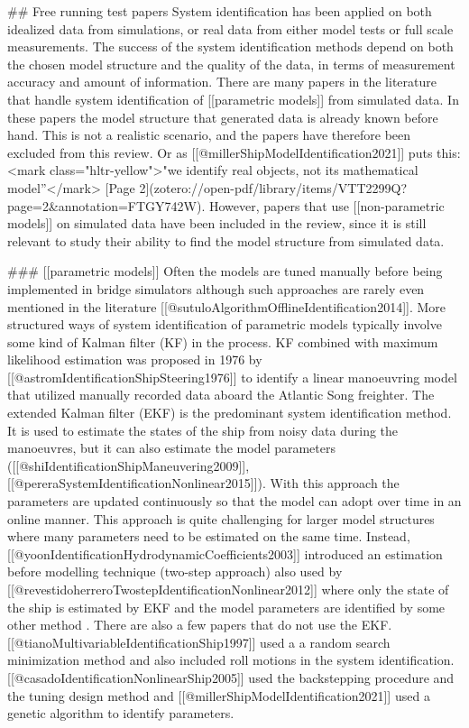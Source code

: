 ## Free running test papers
System identification has been applied on both idealized data from simulations, or real data from either model tests or full scale measurements. The success of the system identification methods depend on both the chosen model structure and the quality of the data, in terms of measurement accuracy and amount of information. 
There are many papers in the literature that handle system identification of [[parametric models]] from simulated data. 
In these papers the model structure that generated data is already known before hand. This is not a realistic scenario, and the papers have therefore been excluded from this review. Or as [[@millerShipModelIdentification2021]] puts this: <mark class="hltr-yellow">"we identify real objects, not its mathematical model”</mark> [Page 2](zotero://open-pdf/library/items/VTT2299Q?page=2&annotation=FTGY742W). However, papers that use [[non-parametric models]] on simulated data have been included in the review, since it is still relevant to study their ability to find the model structure from simulated data.

### [[parametric models]]
Often the models are tuned manually before being implemented in bridge simulators although such approaches are rarely even mentioned in the literature [[@sutuloAlgorithmOfflineIdentification2014]]. More structured ways of system identification of parametric models typically involve some kind of Kalman filter (KF) in the process. KF combined with maximum likelihood estimation was proposed in 1976 by [[@astromIdentificationShipSteering1976]] to identify a linear manoeuvring model that utilized manually recorded data aboard the Atlantic Song freighter. The extended Kalman filter (EKF) is the predominant system identification method. It is used to estimate the states of the ship from noisy data during the manoeuvres, but it can also estimate the model parameters ([[@shiIdentificationShipManeuvering2009]], [[@pereraSystemIdentificationNonlinear2015]]). With this approach the parameters are updated continuously so that the model can adopt over time in an online manner. This approach is quite challenging for larger model structures where many parameters need to be estimated on the same time. Instead, [[@yoonIdentificationHydrodynamicCoefficients2003]] introduced an estimation before modelling technique  (two-step approach) also used by [[@revestidoherreroTwostepIdentificationNonlinear2012]] where only the state of the ship is estimated by EKF and the model parameters are identified by some other method .  
There are also a few papers that do not use the EKF. [[@tianoMultivariableIdentificationShip1997]] used a a random search minimization method and also included roll motions in the system identification. [[@casadoIdentificationNonlinearShip2005]] used the backstepping procedure and the tuning design method and [[@millerShipModelIdentification2021]] used a genetic algorithm   to identify parameters.

